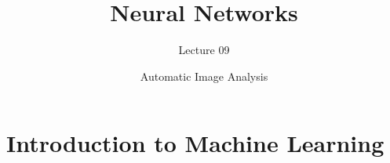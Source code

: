 \documentclass[aspectratio=169,xcolor=dvipsnames]{beamer}
\title[short title]{Neural Networks}
\subtitle{Lecture 09}
\author{Automatic Image Analysis}
\begin{document}
\begin{frame}
    \titlepage
\end{frame}


\section{Introduction to Machine Learning}


% 

\end{document}

